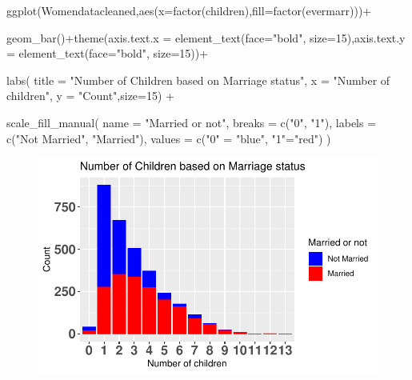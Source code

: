 \documentclass[
  letterpaper,
  DIV=11,
  numbers=noendperiod]{scrartcl}
\newenvironment{Shaded}{\begin{snugshade}}{\end{snugshade}}
\newcommand{\AttributeTok}[1]{\textcolor[rgb]{0.40,0.45,0.13}{#1}}
\newcommand{\DecValTok}[1]{\textcolor[rgb]{0.68,0.00,0.00}{#1}}
\newcommand{\FunctionTok}[1]{\textcolor[rgb]{0.28,0.35,0.67}{#1}}
\newcommand{\NormalTok}[1]{\textcolor[rgb]{0.00,0.23,0.31}{#1}}
\newcommand{\OtherTok}[1]{\textcolor[rgb]{0.00,0.23,0.31}{#1}}
\newcommand{\SpecialCharTok}[1]{\textcolor[rgb]{0.37,0.37,0.37}{#1}}
\newcommand{\StringTok}[1]{\textcolor[rgb]{0.13,0.47,0.30}{#1}}
\begin{document}
\begin{Shaded}
\begin{Highlighting}[]
\FunctionTok{ggplot}\NormalTok{(Womendatacleaned,}\FunctionTok{aes}\NormalTok{(}\AttributeTok{x=}\FunctionTok{factor}\NormalTok{(children),}\AttributeTok{fill=}\FunctionTok{factor}\NormalTok{(evermarr)))}\SpecialCharTok{+}
  
\FunctionTok{geom\_bar}\NormalTok{()}\SpecialCharTok{+}\FunctionTok{theme}\NormalTok{(}\AttributeTok{axis.text.x =} \FunctionTok{element\_text}\NormalTok{(}\AttributeTok{face=}\StringTok{"bold"}\NormalTok{, }\AttributeTok{size=}\DecValTok{15}\NormalTok{),}\AttributeTok{axis.text.y =} \FunctionTok{element\_text}\NormalTok{(}\AttributeTok{face=}\StringTok{"bold"}\NormalTok{, }\AttributeTok{size=}\DecValTok{15}\NormalTok{))}\SpecialCharTok{+}
  
\FunctionTok{labs}\NormalTok{(}
    \AttributeTok{title =} \StringTok{"Number of Children based on Marriage status"}\NormalTok{,}
    \AttributeTok{x =} \StringTok{"Number of children"}\NormalTok{,}
    \AttributeTok{y =} \StringTok{"Count"}\NormalTok{,}\AttributeTok{size=}\DecValTok{15}\NormalTok{) }\SpecialCharTok{+}
   
\FunctionTok{scale\_fill\_manual}\NormalTok{(}
    \AttributeTok{name =} \StringTok{"Married or not"}\NormalTok{,}
    \AttributeTok{breaks =} \FunctionTok{c}\NormalTok{(}\StringTok{"0"}\NormalTok{, }\StringTok{"1"}\NormalTok{),}
    \AttributeTok{labels =} \FunctionTok{c}\NormalTok{(}\StringTok{"Not Married"}\NormalTok{, }\StringTok{"Married"}\NormalTok{),}
    \AttributeTok{values =} \FunctionTok{c}\NormalTok{(}\StringTok{"0"} \OtherTok{=} \StringTok{"blue"}\NormalTok{, }\StringTok{"1"}\OtherTok{=}\StringTok{"red"}\NormalTok{)}
\NormalTok{  )}
\end{Highlighting}
\end{Shaded}

\begin{figure}[H]

{\centering \includegraphics{Fertility_Rates_Education_Impact_Botswana_files/figure-pdf/unnamed-chunk-25-1.pdf}

}

\end{figure}
\end{document}
